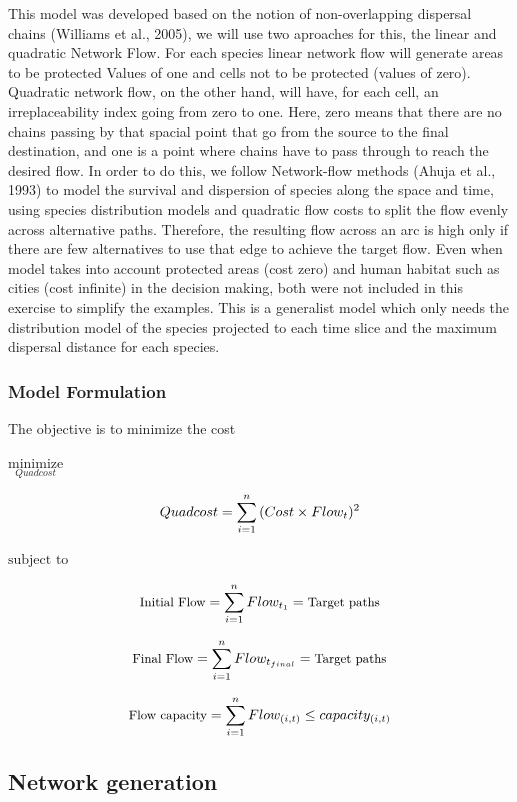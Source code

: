 \documentclass[]{article}
\begin{document}
This model was developed based on the notion of non-overlapping dispersal chains (Williams et al., 2005), we will use two aproaches for this, the linear and quadratic Network Flow. For each species linear network flow will generate areas to be protected Values of one and cells not to be protected (values of zero). Quadratic network flow, on the other hand, will have, for each cell, an irreplaceability index going from zero to one. Here, zero means that there are no chains passing by that spacial point that go from the source to the final destination, and one is a point where chains have to pass through to reach the desired flow.
In order to do this, we follow Network-flow methods (Ahuja et al., 1993) to model the survival and dispersion of species along the space and time, using species distribution models and quadratic flow costs to split the flow evenly across alternative paths. Therefore, the resulting flow across an arc is high only if there are few alternatives to use that edge to achieve the target flow.
Even when model takes into account protected areas (cost zero) and human habitat such as cities (cost infinite) in the decision making, both were not included in this exercise to simplify the examples. This is a generalist model which only needs the distribution model of the species projected to each time slice and the maximum dispersal distance for each species.

\hypertarget{model-formulation}{%
\subsubsection{Model Formulation}\label{model-formulation}}

The objective is to minimize the cost

\(\underset{Quadcost}{\text{minimize}}\)

\[\small Quadcost =  \sum_{i=1}^n{(Cost\times Flow_t)^2}\]

\(\text{subject to}\)

\[\small \text{Initial Flow} = \sum_{i=1}^n{Flow_{t_1}} = \text{Target paths}\]

\[\small \text{Final Flow} = \sum_{i=1}^n{Flow_{t_{final}}} = \text{Target paths}\]

\[\small \text{Flow capacity} = \sum_{i=1}^n{Flow_{(i,t)}} \leq capacity_{(i,t)}\]

\hypertarget{network-generation}{%
\subsection{Network generation}\label{network-generation}}
\end{document}
